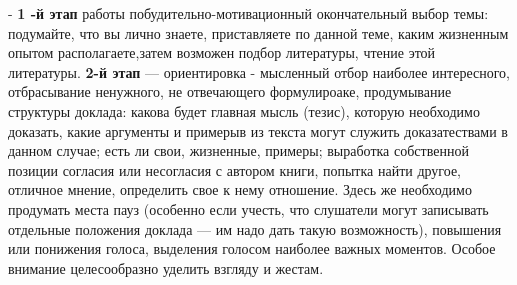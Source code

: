 -  \textbf{1 -й этап} работы побудительно-мотивационный окончательный выбор темы: подумайте, что вы лично знаете, приставляете по данной теме, каким жизненным опытом располагаете,затем возможен подбор литературы, чтение этой литературы.
 \textbf{2-й этап} — ориентировка - мысленный отбор наиболее интересного, отбрасывание ненужного, не отвечающего формулироаке, продумывание структуры доклада: какова будет главная мысль (тезис), которую необходимо доказать, какие аргументы и примерыв из текста могут служить доказатествами в данном случае; есть ли свои, жизненные, примеры; выработка собственной позиции согласия или несогласия с автором  книги, попытка найти другое, отличное мнение, определить свое к нему отношение. Здесь же необходимо продумать места пауз (особенно если учесть, что слушатели могут записывать отдельные положения доклада — им надо дать такую возможность), повышения или понижения голоса, выделения голосом наиболее важных моментов. Особое внимание целесообразно уделить взгляду и жестам. 
